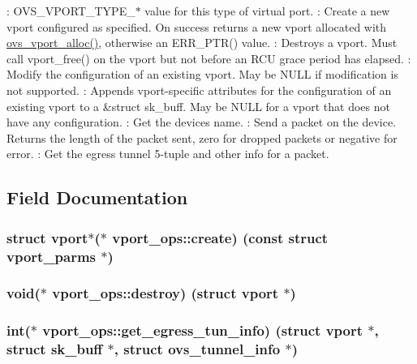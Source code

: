\+: O\+V\+S\+\_\+\+V\+P\+O\+R\+T\+\_\+\+T\+Y\+P\+E\+\_\+$\ast$ value for this type of virtual port. \+: Create a new vport configured as specified. On success returns a new vport allocated with \hyperlink{linux_2vport_8c_a9198ee06111592d2cf6c3b2bf94561c1}{ovs\+\_\+vport\+\_\+alloc()}, otherwise an E\+R\+R\+\_\+\+P\+T\+R() value. \+: Destroys a vport. Must call vport\+\_\+free() on the vport but not before an R\+C\+U grace period has elapsed. \+: Modify the configuration of an existing vport. May be N\+U\+L\+L if modification is not supported. \+: Appends vport-\/specific attributes for the configuration of an existing vport to a \&struct sk\+\_\+buff. May be N\+U\+L\+L for a vport that does not have any configuration. \+: Get the device\textquotesingle{}s name. \+: Send a packet on the device. Returns the length of the packet sent, zero for dropped packets or negative for error. \+: Get the egress tunnel 5-\/tuple and other info for a packet. 

\subsection{Field Documentation}
\hypertarget{structvport__ops_acf3642d1a18755d25c37e9634c6945a2}{}
\subsubsection[{create}]{\setlength{\rightskip}{0pt plus 5cm}struct {\bf vport}$\ast$($\ast$ vport\+\_\+ops\+::create) (const struct {\bf vport\+\_\+parms} $\ast$)}\label{structvport__ops_acf3642d1a18755d25c37e9634c6945a2}
\hypertarget{structvport__ops_a4fd321083545d82f308dc78331649632}{}
\subsubsection[{destroy}]{\setlength{\rightskip}{0pt plus 5cm}void($\ast$ vport\+\_\+ops\+::destroy) (struct {\bf vport} $\ast$)}\label{structvport__ops_a4fd321083545d82f308dc78331649632}
\hypertarget{structvport__ops_a80a9e57f33d01dceca77f83fd3b88d23}{}
\subsubsection[{get\+\_\+egress\+\_\+tun\+\_\+info}]{\setlength{\rightskip}{0pt plus 5cm}int($\ast$ vport\+\_\+ops\+::get\+\_\+egress\+\_\+tun\+\_\+info) (struct {\bf vport} $\ast$, struct sk\+\_\+buff $\ast$, struct {\bf ovs\+\_\+tunnel\+\_\+info} $\ast$)}\label{structvport__ops_a80a9e57f33d01dceca77f83fd3b88d23}
\hypertarget{structvport__ops_abe0c3315271724bf05338487e0ced13c}{}
